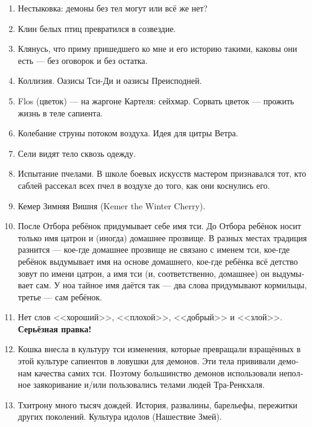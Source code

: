 \documentclass[a4paper,12pt,fleqn]{book}\usepackage{polyglossia}\setdefaultlanguage[babelshorthands=true]{russian}\setotherlanguage{english}\defaultfontfeatures{Ligatures=TeX,Mapping=tex-text}\usepackage{xcolor}\newcommand{\ml}[3]{#2}
\begin{document}
{\begin{enumerate}
\item Нестыковка: демоны без тел могут или всё же нет?

\item Клин белых птиц превратился в созвездие.

\item Клянусь, что приму пришедшего ко мне и его историю такими, каковы они есть --- без оговорок и без остатка.

\item Коллизия. Оазисы Тси-Ди и оазисы Преисподней.

\item Flos (цветок) --- на жаргоне Картеля: сейхмар.
Сорвать цветок --- прожить жизнь в теле сапиента.

\item Колебание струны потоком воздуха.
Идея для цитры Ветра.

\item Сели видят тело сквозь одежду.

\item Испытание пчелами.
В школе боевых искусств мастером признавался тот, кто саблей рассекал всех пчел в воздухе до того, как они коснулись его.

\item Кемер Зимняя Вишня (Kemer the Winter Cherry).

\item После Отбора ребёнок придумывает себе имя тси.
До Отбора ребёнок носит только имя цатрон и (иногда) домашнее прозвище.
В разных местах традиция разнится --- кое-где домашнее прозвище не связано с именем тси, кое-где ребёнок выдумывает имя на основе домашнего, кое-где ребёнка всё детство зовут по имени цатрон, а имя тси (и, соответственно, домашнее) он выдумывает сам.
У ноа тайное имя даётся так --- два слова придумывают кормильцы, третье --- сам ребёнок.

\item Нет слов <<хороший>>, <<плохой>>, <<добрый>> и <<злой>>.
\textbf{Серьёзная правка!}

\item Кошка внесла в культуру тси изменения, которые превращали взращённых в этой культуре сапиентов в ловушки для демонов.
Эти тела прививали демонам качества самих тси.
Поэтому большинство демонов использовали неполное заякоривание и/или пользовались телами людей Тра-Ренкхаля.

\item Тхитрону много тысяч дождей.
История, развалины, барельефы, пережитки других поколений.
Культура идолов (Нашествие Змей).


\end{enumerate}}
\end{document}
